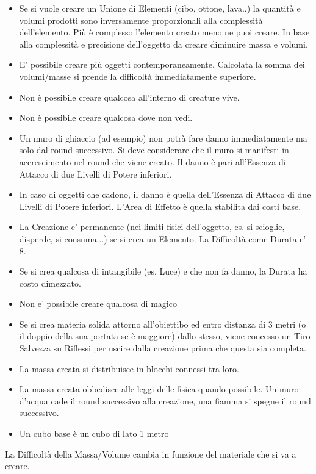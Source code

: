 \documentclass[a4paper,10 pt,twoside,openany]{book}
\begin{document}
\begin{itemize}
	\item Se si vuole creare un Unione di Elementi (cibo, ottone, lava..) la quantità e volumi prodotti sono inversamente proporzionali alla complessità dell'elemento. Più è complesso l'elemento creato meno ne puoi creare. In base alla complessità e precisione dell'oggetto da creare diminuire massa e volumi.
	\item E' possibile creare più oggetti contemporaneamente. Calcolata la somma dei volumi/masse si prende la difficoltà immediatamente superiore.
	\item Non è possibile creare qualcosa all'interno di creature vive.
	\item Non è possibile creare qualcosa dove non vedi.
	\item Un muro di ghiaccio (ad esempio) non potrà fare danno immediatamente ma solo dal round successivo. Si deve considerare che il muro si manifesti in accrescimento nel round che viene creato. Il danno è pari all'Essenza di Attacco di due Livelli di Potere inferiori.
	\item In caso di oggetti che cadono, il danno è quella dell'Essenza di Attacco di due Livelli di Potere inferiori. L'Area di Effetto è quella stabilita dai costi base.
	\item La Creazione e' permanente (nei limiti fisici dell'oggetto, es. si scioglie, disperde, si consuma...) se si crea un Elemento. La Difficoltà come Durata e' 8.
	\item Se si crea qualcosa di intangibile (es. Luce) e che non fa danno, la Durata ha costo dimezzato.
	\item Non e' possibile creare qualcosa di magico
	\item Se si crea materia solida attorno all'obiettibo ed entro distanza di 3 metri (o il doppio della sua portata se è maggiore) dallo stesso, viene concesso un Tiro Salvezza su Riflessi per uscire dalla creazione prima che questa sia completa.
	\item La massa creata si distribuisce in blocchi connessi tra loro.
	\item La massa creata obbedisce alle leggi delle fisica quando possibile. Un muro d'acqua cade il round successivo alla creazione, una fiamma si spegne il round successivo.
	\item Un cubo base è un cubo di lato 1 metro
\end{itemize}

\bigskip


La Difficoltà della Massa/Volume cambia in funzione del materiale che si va a creare.
\end{document}
